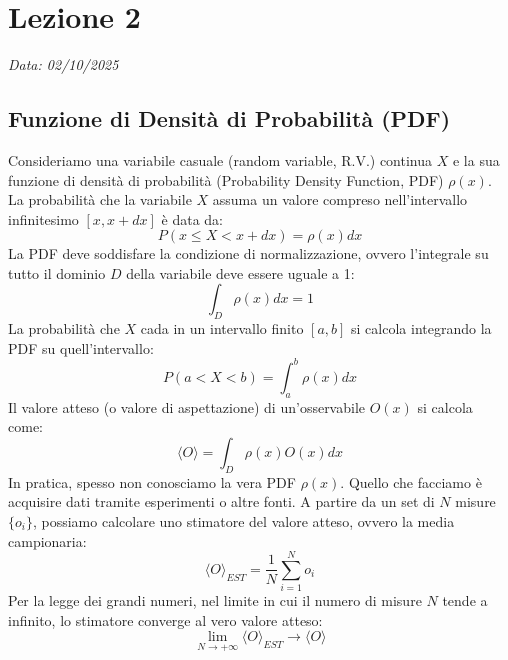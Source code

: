 \chapter{Lezione 2}
\label{chap:lezione_02} 

\begin{flushright}
\textit{Data: 02/10/2025}
\end{flushright}


\section{Funzione di Densità di Probabilità (PDF)}

Consideriamo una variabile casuale (random variable, R.V.) continua $X$ e la sua funzione di densità di probabilità (Probability Density Function, PDF) $\rho(x)$. La probabilità che la variabile $X$ assuma un valore compreso nell'intervallo infinitesimo $[x, x+dx]$ è data da:
\begin{equation}
P(x \le X < x+dx) = \rho(x)dx
\end{equation}
La PDF deve soddisfare la condizione di normalizzazione, ovvero l'integrale su tutto il dominio $D$ della variabile deve essere uguale a 1:
\begin{equation}
\int_D \rho(x)dx = 1
\end{equation}
La probabilità che $X$ cada in un intervallo finito $[a,b]$ si calcola integrando la PDF su quell'intervallo:
\begin{equation}
P(a < X < b) = \int_a^b \rho(x)dx
\end{equation}
Il valore atteso (o valore di aspettazione) di un'osservabile $O(x)$ si calcola come:
\begin{equation}
\langle O \rangle = \int_D \rho(x)O(x)dx
\end{equation}
In pratica, spesso non conosciamo la vera PDF $\rho(x)$. Quello che facciamo è acquisire dati tramite esperimenti o altre fonti. A partire da un set di $N$ misure $\{o_i\}$, possiamo calcolare uno stimatore del valore atteso, ovvero la media campionaria:
\begin{equation}
\langle O \rangle_{EST} = \frac{1}{N}\sum_{i=1}^N o_i
\end{equation}
Per la legge dei grandi numeri, nel limite in cui il numero di misure $N$ tende a infinito, lo stimatore converge al vero valore atteso:
\begin{equation}
\lim_{N \to +\infty} \langle O \rangle_{EST} \to \langle O \rangle
\end{equation}



